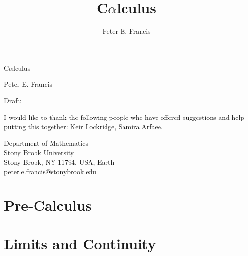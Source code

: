 \documentclass{article}
\title{C$\alpha$lculus}
\author{Peter E. Francis}
\theoremstyle{definition}
\theoremstyle{definition}
\begin{document}
\thispagestyle{empty}

\vspace*{2in}

\begin{Huge}
\noindent C$\alpha$lculus
\end{Huge}

\vspace*{1em}

\noindent Peter E. Francis

\vspace*{5em}

\begin{footnotesize}
\noindent Draft: \DTMnow
\end{footnotesize}

\vfill

\begin{small}
\noindent I would like to thank the following people who have offered suggestions and help putting this together: Keir Lockridge, Samira Arfaee.
\end{small}

\vfill

\noindent Department of Mathematics \\
Stony Brook University\\
Stony Brook, NY 11794, USA, Earth\\

\noindent peter.e.francis@stonybrook.edu

\clearpage

\begingroup
\setcounter{tocdepth}{2}
\makeatletter
\renewcommand*{\l@subsection}{\@dottedtocline{2}{1.5em}{3em}}
\makeatother
\tableofcontents
\endgroup

\clearpage
\listoffigures

\clearpage




\clearpage
\part{Pre-Calculus}

\clearpage

\clearpage



\clearpage
\part{Limits and Continuity}

% 
% 
\end{document}
